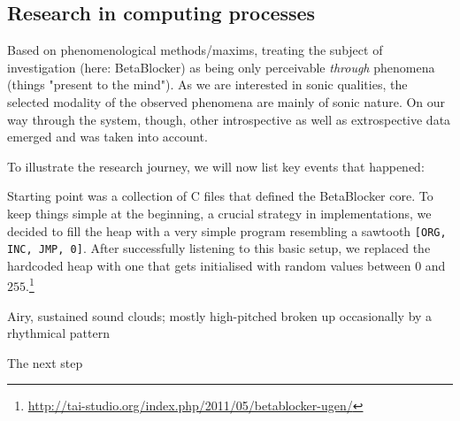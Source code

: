 \documentclass[letterpaper, 12pt]{article}
\begin{document}
\subsection*{Research in computing processes} %
\label{sub:research_in_computing_processes}


Based on phenomenological methods/maxims, treating the subject of investigation (here: BetaBlocker) as being only perceivable \emph{through} phenomena (things "present to the mind"). 
As we are interested in sonic qualities, the selected modality of the observed phenomena are mainly of sonic nature.
On our way through the system, though, other introspective as well as extrospective data emerged and was taken into account.

To illustrate the research journey, we will now list key events that happened:

Starting point was a collection of C files that defined the BetaBlocker core.
To keep things simple at the beginning, a crucial strategy in implementations, we decided to fill the heap with a very simple program resembling a sawtooth \verb#[ORG, INC, JMP, 0]#. 
After successfully listening to this basic setup, we replaced the hardcoded heap with one that gets initialised with random values between $0$ and $255$.\footnote{\url{http://tai-studio.org/index.php/2011/05/betablocker-ugen/}}

Airy, sustained sound clouds; mostly high-pitched broken up occasionally by a rhythmical pattern

The next step
\end{document}

